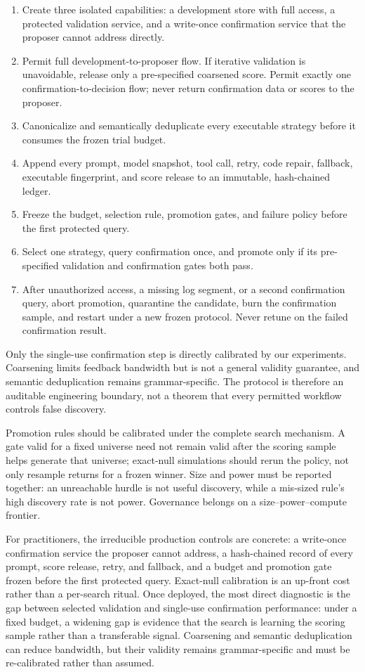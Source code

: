 \documentclass[sigconf,nonacm]{acmart}
\begin{document}
\begin{enumerate}
  \item Create three isolated capabilities: a development store with full
  access, a protected validation service, and a write-once confirmation service
  that the proposer cannot address directly.
  \item Permit full development-to-proposer flow. If iterative validation is
  unavoidable, release only a pre-specified coarsened score. Permit exactly one
  confirmation-to-decision flow; never return confirmation data or scores to
  the proposer.
  \item Canonicalize and semantically deduplicate every executable strategy
  before it consumes the frozen trial budget.
  \item Append every prompt, model snapshot, tool call, retry, code repair,
  fallback, executable fingerprint, and score release to an immutable,
  hash-chained ledger.
  \item Freeze the budget, selection rule, promotion gates, and failure policy
  before the first protected query.
  \item Select one strategy, query confirmation once, and promote only if its
  pre-specified validation and confirmation gates both pass.
  \item After unauthorized access, a missing log segment, or a second
  confirmation query, abort promotion, quarantine the candidate, burn the
  confirmation sample, and restart under a new frozen protocol. Never retune on
  the failed confirmation result.
\end{enumerate}

Only the single-use confirmation step is directly calibrated by our experiments.
Coarsening limits feedback bandwidth but is not a general validity guarantee,
and semantic deduplication remains grammar-specific. The protocol is therefore
an auditable engineering boundary, not a theorem that every permitted workflow
controls false discovery.

Promotion rules should be calibrated under the complete search mechanism. A
gate valid for a fixed universe need not remain valid after the scoring sample
helps generate that universe; exact-null simulations should rerun the policy,
not only resample returns for a frozen winner. Size and power must be reported
together: an unreachable hurdle is not useful discovery, while a mis-sized rule's
high discovery rate is not power. Governance belongs on a size--power--compute
frontier.

For practitioners, the irreducible production controls are concrete: a
write-once confirmation service the proposer cannot address, a hash-chained
record of every prompt, score release, retry, and fallback, and a budget and
promotion gate frozen before the first protected query. Exact-null calibration
is an up-front cost rather than a per-search ritual. Once deployed, the most
direct diagnostic is the gap between selected validation and single-use
confirmation performance: under a fixed budget, a widening gap is evidence
that the search is learning the scoring sample rather than a transferable
signal. Coarsening and semantic deduplication can reduce bandwidth, but their
validity remains grammar-specific and must be re-calibrated rather than assumed.
\end{document}
